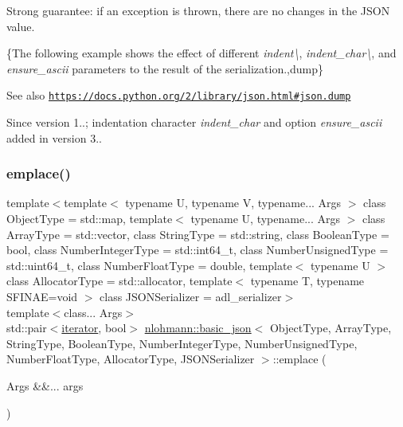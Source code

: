 Strong guarantee\+: if an exception is thrown, there are no changes in the J\+S\+ON value.

\{The following example shows the effect of different {\itshape indent\textbackslash{}}, {\itshape indent\+\_\+char\textbackslash{}}, and {\itshape ensure\+\_\+ascii} parameters to the result of the serialization.,dump\}

\begin{DoxySeeAlso}{See also}
\href{https://docs.python.org/2/library/json.html#json.dump}{\tt https\+://docs.\+python.\+org/2/library/json.\+html\#json.\+dump}
\end{DoxySeeAlso}
\begin{DoxySince}{Since}
version 1..; indentation character {\itshape indent\+\_\+char} and option {\itshape ensure\+\_\+ascii} added in version 3.. 
\end{DoxySince}
\mbox{\label{classnlohmann_1_1basic__json_a5338e282d1d02bed389d852dd670d98d}} 
\subsubsection{\texorpdfstring{emplace()}{emplace()}}
{\footnotesize\ttfamily template$<$template$<$ typename U, typename V, typename... Args $>$ class Object\+Type = std\+::map, template$<$ typename U, typename... Args $>$ class Array\+Type = std\+::vector, class String\+Type  = std\+::string, class Boolean\+Type  = bool, class Number\+Integer\+Type  = std\+::int64\+\_\+t, class Number\+Unsigned\+Type  = std\+::uint64\+\_\+t, class Number\+Float\+Type  = double, template$<$ typename U $>$ class Allocator\+Type = std\+::allocator, template$<$ typename T, typename S\+F\+I\+N\+A\+E=void $>$ class J\+S\+O\+N\+Serializer = adl\+\_\+serializer$>$ \\
template$<$class... Args$>$ \\
std\+::pair$<$\mbox{\hyperlink{classnlohmann_1_1basic__json_a099316232c76c034030a38faa6e34dca}{iterator}}, bool$>$ \mbox{\hyperlink{classnlohmann_1_1basic__json}{nlohmann\+::basic\+\_\+json}}$<$ Object\+Type, Array\+Type, String\+Type, Boolean\+Type, Number\+Integer\+Type, Number\+Unsigned\+Type, Number\+Float\+Type, Allocator\+Type, J\+S\+O\+N\+Serializer $>$\+::emplace (\begin{DoxyParamCaption}\item[{Args \&\&...}]{args }\end{DoxyParamCaption})\hspace{0.3cm}{\ttfamily [inline]}}



